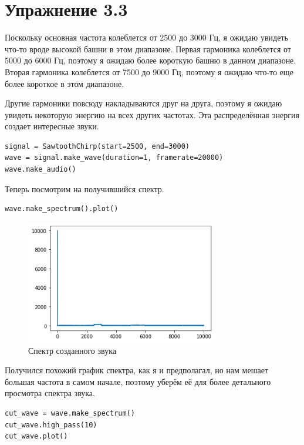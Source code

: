 \documentclass[a4paper,12pt]{report}
\begin{document}
\chapter{Упражнение 3.3}

Поскольку основная частота колеблется от 2500 до 3000 Гц, я ожидаю увидеть что-то вроде высокой башни в этом диапазоне. Первая гармоника колеблется от 5000 до 6000 Гц, поэтому я ожидаю более короткую башню в данном диапазоне. Вторая гармоника колеблется от 7500 до 9000 Гц, поэтому я ожидаю что-то еще более короткое в этом диапазоне.

Другие гармоники повсюду накладываются друг на друга, поэтому я ожидаю увидеть некоторую энергию на всех других частотах. Эта распределённая энергия создает интересные звуки.

\begin{lstlisting}[caption=Создание сигнала]
signal = SawtoothChirp(start=2500, end=3000)
wave = signal.make_wave(duration=1, framerate=20000)
wave.make_audio()
\end{lstlisting}

Теперь посмотрим на получившийся спектр.

\begin{lstlisting}[caption=Визуализация спектра]
wave.make_spectrum().plot()
\end{lstlisting}

\begin{figure}[H]
        \centering
        \includegraphics[width=0.75\textwidth]{lab3_fig3_1.png}
        \caption{Спектр созданного звука}
        \label{fig:lab3_fig3_1}
\end{figure}

Получился похожий график спектра, как я и предполагал, но нам мешает большая частота в самом начале, поэтому уберём её для более детального просмотра спектра звука.

\begin{lstlisting}[caption=Удаление частоты в начале]
cut_wave = wave.make_spectrum()
cut_wave.high_pass(10)
cut_wave.plot()
\end{lstlisting}
\end{document}
